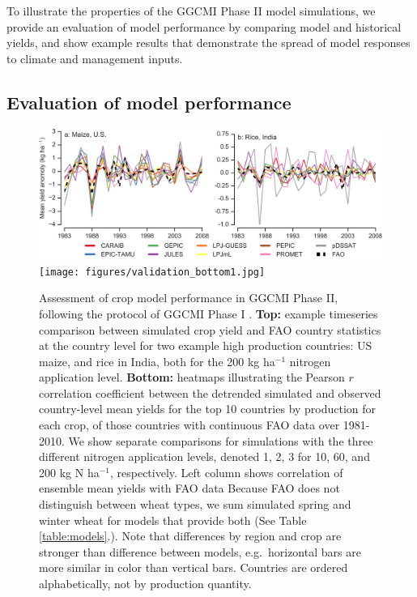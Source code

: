 \documentclass[gmd, manuscript]{copernicus} %
\begin{document}
To illustrate the properties of the GGCMI Phase II model simulations, we provide an evaluation of model performance by comparing model and historical yields, and show example results that demonstrate the spread of model responses to climate and management inputs. 

\subsection{Evaluation of model performance}
\begin{figure}[ht]
  \centering
  \includegraphics[width=14.5cm]{figures/validation_top.png}
  \texttt{[image: figures/validation\_bottom1.jpg]}
  \caption{
  Assessment of crop model performance in GGCMI Phase II, following the protocol of GGCMI Phase I \citep{muller_global_2017}. 
  \textbf{Top:} example timeseries comparison between simulated crop yield and FAO country statistics \citep{FAOSTAT} at the country level for two example high production countries: US maize, and rice in India, both for the 200 kg ha$^{-1}$ nitrogen application level. 
  \textbf{Bottom:} heatmaps illustrating the Pearson $r$ correlation coefficient between the detrended simulated and observed country-level mean yields for the top 10 countries by production for each crop, of those countries with continuous FAO data over 1981-2010.
  We show separate comparisons for simulations with the three different nitrogen application levels, denoted 1, 2, 3 for 10, 60, and 200 kg N ha$^{-1}$, respectively. 
  Left column shows correlation of ensemble mean yields with FAO data 
  Because FAO does not distinguish between wheat types, we sum simulated spring and winter wheat for models that provide both (See Table \ref{table:models}.). 
  Note that differences by region and crop are stronger than difference between models, e.g.\ horizontal bars are more similar in color than vertical bars.
  Countries are ordered alphabetically, not by production quantity.
  }
  \label{fig:simulation_val}
\end{figure}
\end{document}
